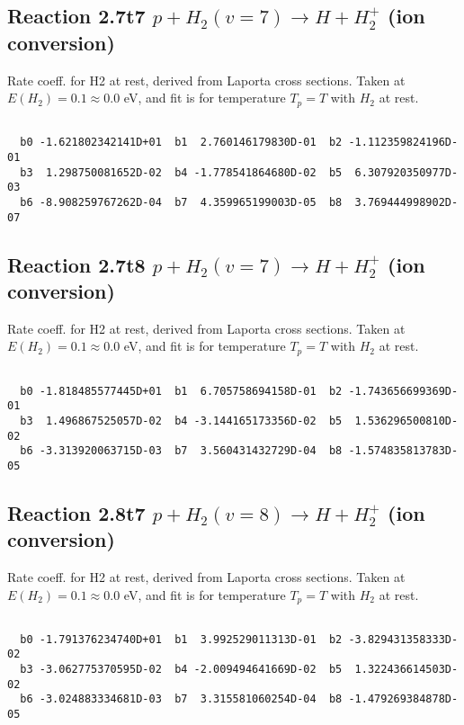 \documentclass[12pt,dvipdfmx]{article}
\begin{document}
\newpage
\subsection{
Reaction 2.7t7
$ p + H_2(v=7) \rightarrow H + H_2^+$ (ion conversion)
}
Rate coeff. for H2 at rest, derived from Laporta cross sections.
Taken at $E(H_2) = 0.1 \approx 0.0$ eV,  and fit is for temperature $T_p=T$ with $H_2$ at rest.

\begin{small}\begin{verbatim}

  b0 -1.621802342141D+01  b1  2.760146179830D-01  b2 -1.112359824196D-01
  b3  1.298750081652D-02  b4 -1.778541864680D-02  b5  6.307920350977D-03
  b6 -8.908259767262D-04  b7  4.359965199003D-05  b8  3.769444998902D-07

\end{verbatim}\end{small}

\newpage
\subsection{
Reaction 2.7t8
$ p + H_2(v=7) \rightarrow H + H_2^+$ (ion conversion)
}
Rate coeff. for H2 at rest, derived from Laporta cross sections.
Taken at $E(H_2) = 0.1 \approx 0.0$ eV,  and fit is for temperature $T_p=T$ with $H_2$ at rest.

\begin{small}\begin{verbatim}

  b0 -1.818485577445D+01  b1  6.705758694158D-01  b2 -1.743656699369D-01
  b3  1.496867525057D-02  b4 -3.144165173356D-02  b5  1.536296500810D-02
  b6 -3.313920063715D-03  b7  3.560431432729D-04  b8 -1.574835813783D-05

\end{verbatim}\end{small}

\newpage
\subsection{
Reaction 2.8t7
$ p + H_2(v=8) \rightarrow H + H_2^+$ (ion conversion)
}
Rate coeff. for H2 at rest, derived from Laporta cross sections.
Taken at $E(H_2) = 0.1 \approx 0.0$ eV,  and fit is for temperature $T_p=T$ with $H_2$ at rest.

\begin{small}\begin{verbatim}

  b0 -1.791376234740D+01  b1  3.992529011313D-01  b2 -3.829431358333D-02
  b3 -3.062775370595D-02  b4 -2.009494641669D-02  b5  1.322436614503D-02
  b6 -3.024883334681D-03  b7  3.315581060254D-04  b8 -1.479269384878D-05

\end{verbatim}\end{small}
\end{document}
